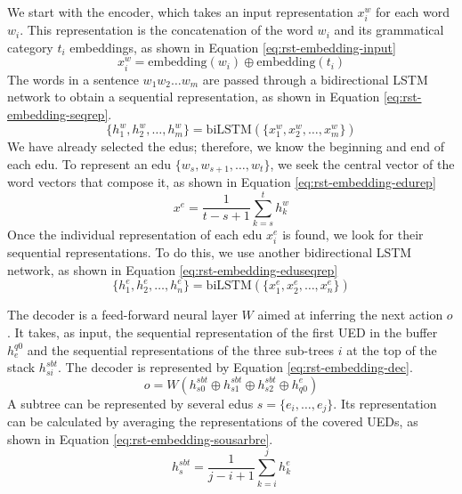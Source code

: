 \documentclass{KBook}
\begin{document}
We start with the encoder, which takes an input representation $x_i^w$ for each word $w_i$. This representation is the concatenation of the word $w_i$ and its grammatical category $t_i$ embeddings, as shown in Equation \ref{eq:rst-embedding-input}
\begin{equation}\label{eq:rst-embedding-input}
	x_i^w = \text{embedding}(w_i) \oplus \text{embedding}(t_i)
\end{equation}
The words in a sentence $w_1 w_2 \ldots w_m$ are passed through a bidirectional LSTM network to obtain a sequential representation, as shown in Equation \ref{eq:rst-embedding-seqrep}.
\begin{equation}\label{eq:rst-embedding-seqrep}
	\{h_1^w, h_2^w, \ldots, h_m^w \} = \text{biLSTM}(\{x_1^w, x_2^w, \ldots, x_m^w \})
\end{equation}
We have already selected the \acp{edu}; therefore, we know the beginning and end of each \ac{edu}. To represent an \ac{edu} $\{w_s, w_{s+1}, \ldots, w_t \}$, we seek the central vector of the word vectors that compose it, as shown in Equation \ref{eq:rst-embedding-edurep}
\begin{equation}\label{eq:rst-embedding-edurep}
	x^e = \frac{1}{t-s+1} \sum_{k=s}^{t} h_k^w
\end{equation}
Once the individual representation of each \ac{edu} $x_i^e$ is found, we look for their sequential representations. To do this, we use another bidirectional LSTM network, as shown in Equation \ref{eq:rst-embedding-eduseqrep}
\begin{equation}\label{eq:rst-embedding-eduseqrep}
	\{h_1^e, h_2^e, \ldots, h_n^e \} = \text{biLSTM}(\{x_1^e, x_2^e, \ldots, x_n^e \})
\end{equation}


The decoder is a feed-forward neural layer $W$ aimed at inferring the next action $o$. It takes, as input, the sequential representation of the first UED in the buffer $h_{e}^{q0}$ and the sequential representations of the three sub-trees $i$ at the top of the stack $h_{si}^{sbt}$. The decoder is represented by Equation \ref{eq:rst-embedding-dec}.
\begin{equation}\label{eq:rst-embedding-dec}
	o = W(h_{s0}^{sbt} \oplus h_{s1}^{sbt} \oplus h_{s2}^{sbt} \oplus h_{q0}^{e})
\end{equation}
A subtree can be represented by several \ac{edu}s $ s= \{e_i, \ldots, e_j\}$. Its representation can be calculated by averaging the representations of the covered UEDs, as shown in Equation \ref{eq:rst-embedding-sousarbre}.
\begin{equation}\label{eq:rst-embedding-sousarbre}
	h_{s}^{sbt} = \frac{1}{j-i+1} \sum_{k=i}^{j} h_k^e
\end{equation}
\end{document}
